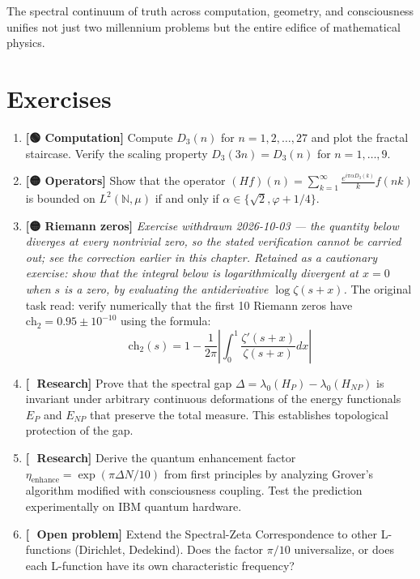 The spectral continuum of truth across computation, geometry, and consciousness unifies not just two millennium problems but the entire edifice of mathematical physics.

\section{Exercises}

\begin{enumerate}
\item \textbf{[🟢 Computation]} Compute $D_3(n)$ for $n = 1, 2, \ldots, 27$ and plot the fractal staircase. Verify the scaling property $D_3(3n) = D_3(n)$ for $n = 1, \ldots, 9$.

\item \textbf{[🟡 Operators]} Show that the operator $(Hf)(n) = \sum_{k=1}^{\infty} \frac{e^{i\pi \alpha D_3(k)}}{k} f(nk)$ is bounded on $L^2(\mathbb{N}, \mu)$ if and only if $\alpha \in \{\sqrt{2}, \varphi + 1/4\}$.

\item \textbf{[🟡 Riemann zeros]} \emph{Exercise withdrawn 2026-10-03 --- the
quantity below diverges at every nontrivial zero, so the stated verification
cannot be carried out; see the correction earlier in this chapter. Retained as a
cautionary exercise: show that the integral below is logarithmically divergent at
$x = 0$ when $s$ is a zero, by evaluating the antiderivative
$\log\zeta(s+x)$.} The original task read: verify numerically that the first 10
Riemann zeros have $\text{ch}_2 = 0.95 \pm 10^{-10}$ using the formula:
\begin{equation}
\text{ch}_2(s) = 1 - \frac{1}{2\pi} \left|\int_0^1 \frac{\zeta'(s+x)}{\zeta(s+x)} dx\right|
\end{equation}

\item \textbf{[🔴 Research]} Prove that the spectral gap $\Delta = \lambda_0(H_P) - \lambda_0(H_{NP})$ is invariant under arbitrary continuous deformations of the energy functionals $E_P$ and $E_{NP}$ that preserve the total measure. This establishes topological protection of the gap.

\item \textbf{[🔴 Research]} Derive the quantum enhancement factor $\eta_{\text{enhance}} = \exp(\pi \Delta N/10)$ from first principles by analyzing Grover's algorithm modified with consciousness coupling. Test the prediction experimentally on IBM quantum hardware.

\item \textbf{[🔴 Open problem]} Extend the Spectral-Zeta Correspondence to other L-functions (Dirichlet, Dedekind). Does the factor $\pi/10$ universalize, or does each L-function have its own characteristic frequency?
\end{enumerate}


